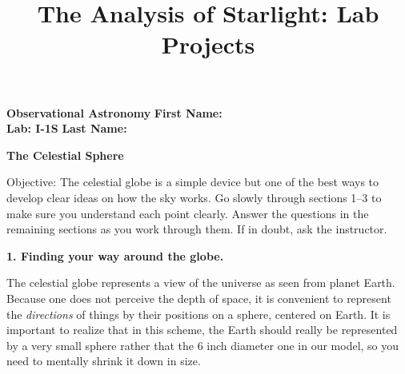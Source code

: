 \documentclass[12pt]{article}
\title{The Analysis of Starlight: Lab Projects}
\begin{document}
\setcounter{page}{1}
\setcounter{equation}{0}
\pagestyle{plain}
\thispagestyle{empty}  %
\newcommand{\kms}{\hbox{km\,s$^{\rm -1}$}}
\def\lo {\ifmmode {\,{\it L}\solar} \else $\,L$\solar\fi}       %
\def\my {\ifmmode {\,{\it M}\solar\,{\rm yr^{-1}}}              %
        \else {$\,M$\solar$\,$yr$^{\rm -1}$}\fi}
\def\BD {BD$\,$+30{\degr}3639}
\def\HUNO{\rm H$\,$I}                   %
\def\HDOS{\rm H$_2$}                    %
\def\arcsec{\ifmmode {^{\scriptscriptstyle\prime\prime}}
          \else $^{\scriptscriptstyle\prime\prime}$\fi}
\def\arcminm{\ifmmode {^{\scriptscriptstyle\prime}}
          \else $^{\scriptscriptstyle\prime}$\fi}
\def\deg{\ifmmode^\circ\else$^\circ$\fi}







\noindent
{\bf Observational Astronomy    \hfill} {\bf First Name:\makebox[4cm]{\hrulefill}}\\
{\bf Lab: I-1S} \hfill {\bf Last Name:\makebox[4cm]{\hrulefill}}


\bigskip

\medskip

\noindent
{\hfill \Large {\bf  The Celestial Sphere} \hfill}


\bigskip

\noindent
{Objective:} The celestial globe is a simple device but one of the
best ways to develop clear ideas on how the sky works. Go slowly
through sections 1--3 to make sure you understand each point
clearly. Answer the questions in the remaining sections as you work
through them. If in doubt, ask the instructor.

\medskip
\noindent
{\bf 1. Finding your way around the globe.}

\medskip
\noindent
The celestial globe represents a view of the universe as seen from planet
Earth. Because one does not perceive the depth of space, it is
convenient to represent the \emph{directions} of things by their
positions on a sphere, centered on Earth. It is important to realize
that in this scheme, the Earth should really be represented by a
very small sphere rather that the 6 inch diameter one in our
model, so you need to mentally shrink it down in size.
\end{document}
